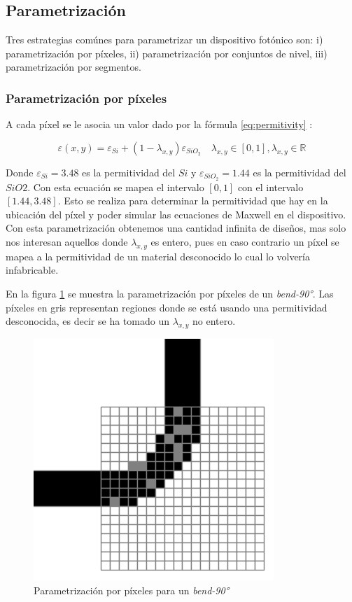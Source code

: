 \subsection{Parametrización}

Tres estrategias comúnes para parametrizar un dispositivo fotónico son: i) parametrización por píxeles, ii) parametrización por conjuntos de nivel, iii) parametrización por segmentos.

\subsubsection{Parametrización por píxeles}

A cada píxel se le asocia un valor dado por la fórmula \ref{eq:permitivity} \citep{Su2020}:

\begin{equation}
  \varepsilon(x, y) = \varepsilon_{Si} + (1 - \lambda_{x,y}) \varepsilon_{SiO_2} \quad \lambda_{x, y} \in [0, 1], \lambda_{x, y} \in \mathbb{R} 
\label{eq:permitivity}
\end{equation}

Donde $\varepsilon_{Si} = 3.48$ es la permitividad del $Si$ y $\varepsilon_{SiO_2} = 1.44$ es la permitividad del $SiO2$.
Con esta ecuación se mapea el intervalo $[0, 1]$ con el intervalo $[1.44, 3.48]$. 
Esto se realiza para determinar la permitividad que hay en la ubicación del píxel y poder simular las ecuaciones de Maxwell en el dispositivo.
Con esta parametrización obtenemos una cantidad infinita de diseños, mas solo nos interesan aquellos donde $\lambda_{x,y}$ es entero, pues en caso contrario un píxel se mapea a la permitividad de un material desconocido lo cual lo volvería infabricable.


En la figura \ref{fig:pixeles} se muestra la parametrización por píxeles de un \emph{bend-90°}. 
Las píxeles en gris representan regiones donde se está usando una permitividad desconocida, es decir se ha tomado un $\lambda_{x,y}$ no entero.

\begin{figure}[h]
  \centering
  \includegraphics[scale=0.8]{image/theory/parametrization-pixeles.png}
  \caption{Parametrización por píxeles para un \emph{bend-90°}}
  \label{fig:pixeles}
\end{figure}


